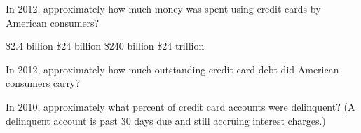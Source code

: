 \documentclass{ximera}
\begin{document}
\begin{question}
In 2012, approximately how much money was spent using credit cards by American consumers?
  \begin{solution}
    \begin{multiple-choice}
    	\choice \$2.4 billion
        \choice \$24 billion
        \choice \$240 billion
        \choice \$24 trillion
    \end{multiple-choice}
  \end{solution}
\end{question}

\begin{question}
In 2012, approximately how much outstanding credit card debt did American consumers carry?
  \begin{solution}
    \begin{multiple-choice}
    \end{multiple-choice}
  \end{solution}
\end{question}

\begin{question}
In 2010, approximately what percent of credit card accounts were delinquent? (A delinquent account is past 30 days due and still accruing interest charges.)
  \begin{solution}
    \begin{multiple-choice}
    \end{multiple-choice}
  \end{solution}
\end{question}
\end{document}
